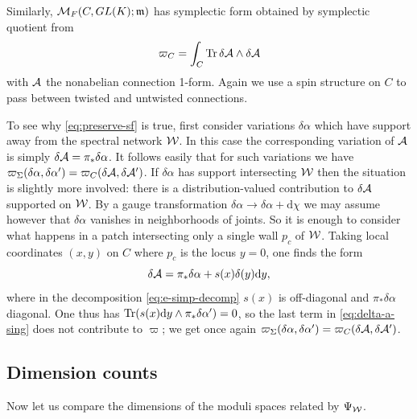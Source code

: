 \documentclass[11pt,a4paper]{article}
\def\CM {{\cal M}}
\def\wnet {{\cal W}}
\def\CA{{\cal A}}
\def\CM {{\cal M}}
\def\wnet {{\cal W}}
\def\CA{{\cal A}}
\newcommand\de{{\mathrm{d}}}
\begin{document}
Similarly, $\CM_F(C, GL(K); \mathfrak{m})$ has symplectic form obtained
by symplectic quotient from
\begin{equation}
\varpi_{C} = \int_{C}{\rm Tr}\,\delta \CA  \wedge \delta \CA
\end{equation}
with $\CA$ the nonabelian connection 1-form.  Again we use a spin structure on $C$
to pass between twisted and untwisted connections.

To see why \eqref{eq:preserve-sf} is true,
first consider variations $\delta \alpha$ which have support away
from the spectral network $\wnet$.  In this case the corresponding
variation of $\CA$ is simply
$\delta \CA = \pi_* \delta \alpha$.
It follows easily that for such variations we have $\varpi_\Sigma(\delta \alpha, \delta \alpha') = \varpi_C(\delta \CA, \delta \CA')$.
If $\delta \alpha$ has support intersecting $\wnet$ then the situation is slightly more involved:
there is a distribution-valued contribution to $\delta \CA$ supported on $\wnet$.
By a gauge transformation $\delta \alpha \to \delta \alpha + \de \chi$
we may assume however that $\delta \alpha$ vanishes in neighborhoods of joints.
So it is enough to consider what happens in a patch intersecting only a single wall $p_c$ of $\wnet$.
Taking local coordinates $(x,y)$ on $C$
where $p_c$ is the locus $y = 0$, one finds the form
\begin{equation} \label{eq:delta-a-sing}
 \delta \CA = \pi_* \delta \alpha + s(x) \delta(y) \de y,
\end{equation}
where in the decomposition
\eqref{eq:e-simp-decomp} $s(x)$ is off-diagonal and $\pi_* \delta \alpha$ diagonal.
One thus has ${\rm{Tr}} (s(x) \de y \wedge \pi_* \delta \alpha') = 0$,
so the last term in \eqref{eq:delta-a-sing}
does not contribute to $\varpi$; we get once again
$\varpi_\Sigma(\delta \alpha, \delta \alpha') = \varpi_C(\delta \CA, \delta \CA')$.



\subsection{Dimension counts} \label{sec:dimensions}

Now let us compare the dimensions of the moduli spaces related by $\Psi_\wnet$.
\end{document}
